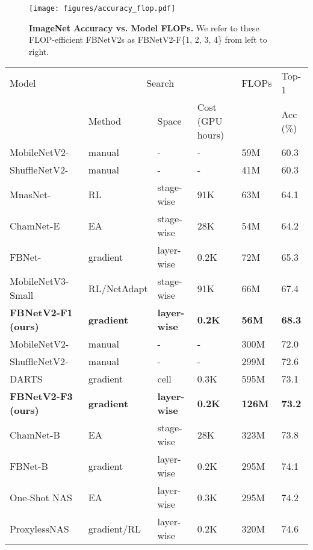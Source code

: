 \documentclass[10pt,twocolumn,letterpaper]{article}
\begin{document}
\begin{figure}
    \centering
    \texttt{[image: figures/accuracy\_flop.pdf]}
    \caption{\textbf{ImageNet Accuracy vs. Model FLOPs.} We refer to these FLOP-efficient FBNetV2s as FBNetV2-F\{1, 2, 3, 4\} from left to right.} 
    \label{fig:results-flop-efficient}
\end{figure}

\begin{table*}[t]
\small
\centering
\begin{tabular*}{\textwidth}{l @{\extracolsep{\fill}} lllll}
\toprule
Model & \multicolumn{3}{c}{Search} & FLOPs & Top-1 \\ 
 \cmidrule{2-4}
 & Method & Space & Cost (GPU hours) & & Acc (\%) \\
\midrule
MobileNetV2-~\cite{mobilenetv2} & manual & - & - & 59M & 60.3 \\
ShuffleNetV2-~\cite{shufflenetv2} & manual  & - & - & 41M  & 60.3 \\
MnasNet-~\cite{mnasnet} & RL  & stage-wise & 91K & 63M & 64.1    \\
ChamNet-E~\cite{chamnet}& EA & stage-wise  & 28K & 54M & 64.2 \\
FBNet-~\cite{fbnet}  & gradient & layer-wise  & 0.2K  & 72M & 65.3 \\ 
MobileNetV3-Small~\cite{mobilenetv3} & RL/NetAdapt & stage-wise & 91K  & 66M & 67.4 \\
\textbf{FBNetV2-F1 (ours)} & \textbf{gradient} & \textbf{layer-wise}  & \textbf{0.2K} & \textbf{56M}    & \textbf{68.3}   \\ \hline
MobileNetV2- \cite{mobilenetv2} & manual & - & - & 300M & 72.0 \\
ShuffleNetV2- \cite{shufflenetv2} & manual  & - & - & 299M    & 72.6 \\
DARTS  \cite{darts}  & gradient & cell & 0.3K & 595M & 73.1   \\ 
\textbf{FBNetV2-F3 (ours)} & \textbf{gradient} & \textbf{layer-wise}  & \textbf{0.2K} & \textbf{126M} & \textbf{73.2}   \\
\hline
ChamNet-B~\cite{chamnet}& EA & stage-wise  & 28K & 323M & 73.8 \\
FBNet-B~\cite{fbnet} & gradient & layer-wise & 0.2K & 295M & 74.1 \\
One-Shot NAS~\cite{one-shot} & EA & layer-wise & 0.3K & 295M & 74.2 \\
ProxylessNAS~\cite{proxylessnas} & gradient/RL  & layer-wise & 0.2K & 320M & 74.6 \\

\end{tabular*}
\end{table*}
\end{document}
